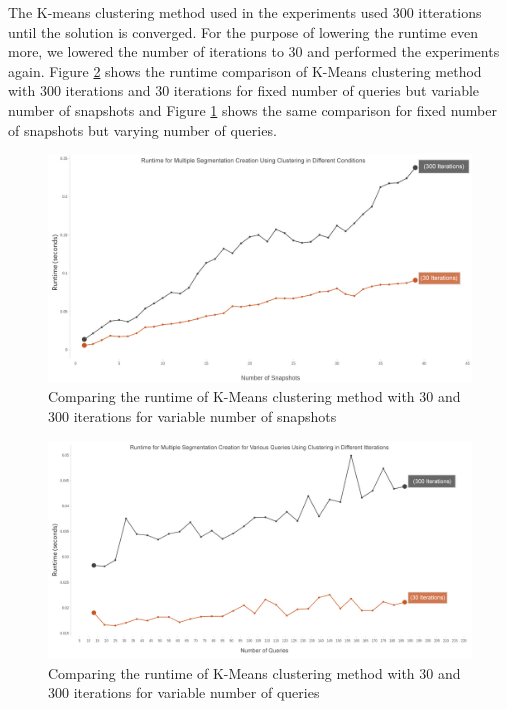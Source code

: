 			The K-means clustering method used in the experiments used 300 itterations until the solution is converged. For the purpose of lowering the runtime even more, we lowered the number of iterations to 30 and performed the experiments again. Figure \ref{fig:clustering_comparison_multiQuery} shows the runtime comparison of K-Means clustering method with 300 iterations and 30 iterations for fixed number of queries but variable number of snapshots and Figure \ref{fig:clustering_comparison_multiSnap} shows the same comparison for fixed number of snapshots but varying number of queries.

			\begin{figure}
				\centering
				\includegraphics[width=\textwidth]{figs/multiSnap_clustering.jpg}
				\caption{Comparing the runtime of K-Means clustering method with 30 and 300 iterations for variable number of snapshots}
				\label{fig:clustering_comparison_multiSnap}
			\end{figure} 

			\begin{figure}
				\centering
				\includegraphics[width=\textwidth]{figs/multiQuery_clustering.jpg}
				\caption{Comparing the runtime of K-Means clustering method with 30 and 300 iterations for variable number of queries}
				\label{fig:clustering_comparison_multiQuery}
			\end{figure} 

